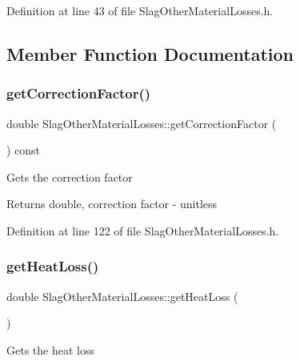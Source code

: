 Definition at line 43 of file Slag\+Other\+Material\+Losses.\+h.



\subsection{Member Function Documentation}
\mbox{\label{class_slag_other_material_losses_a920bbc2da2ba90416e86573830eee2cb}} 
\subsubsection{\texorpdfstring{get\+Correction\+Factor()}{getCorrectionFactor()}}
{\footnotesize\ttfamily double Slag\+Other\+Material\+Losses\+::get\+Correction\+Factor (\begin{DoxyParamCaption}{ }\end{DoxyParamCaption}) const\hspace{0.3cm}{\ttfamily [inline]}}

Gets the correction factor

\begin{DoxyReturn}{Returns}
double, correction factor -\/ unitless 
\end{DoxyReturn}


Definition at line 122 of file Slag\+Other\+Material\+Losses.\+h.

\mbox{\label{class_slag_other_material_losses_a4c96a826ef6da38f4c27f7efd8b4a7ba}} 
\subsubsection{\texorpdfstring{get\+Heat\+Loss()}{getHeatLoss()}}
{\footnotesize\ttfamily double Slag\+Other\+Material\+Losses\+::get\+Heat\+Loss (\begin{DoxyParamCaption}{ }\end{DoxyParamCaption})}

Gets the heat loss

